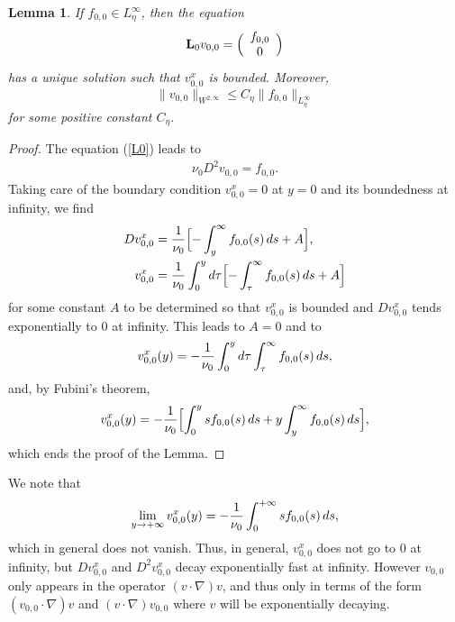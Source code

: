 \documentclass[11pt]{article}
\newtheorem{lemma}[theorem]{Lemma}
\begin{document}
\begin{lemma}\label{lemma 20}
If $f_{0,0} \in L^{\infty}_\eta$, then the equation
\begin{equation} \label{L0}
{\bf L}_0 v_{0,0} = \Bigl( \begin{array}{c} f_{0,0} \cr 0 \cr \end{array} \Bigr)
\end{equation}
has a unique solution such that $v_{0,0}^x$ is bounded.
Moreover, 
$$
\| v_{0,0} \|_{W^{2,\infty}}  \le C_\eta \| f_{0,0} \|_{L^{\infty}_\eta}
$$
for some positive constant $C_\eta$.
\end{lemma}


\begin{proof}
The equation (\ref{L0}) leads to
\begin{align*}
\nu_0 D^2 v_{0,0} = f_{0,0}.
\end{align*}
Taking care of the boundary condition $v_{0,0}^x = 0$ at $y = 0$ and its boundedness at infinity, we find
\begin{align*}
D v_{0,0}^x &= {1 \over \nu_0} \Bigl[ - \int_y^\infty f_{0,0}(s) \, ds + A \Bigr],
\\
v_{0,0}^x &= {1 \over \nu_0} \int_0^y d\tau \Bigl[ - \int_\tau^\infty f_{0,0}(s) \, ds
+ A \Bigr]
\end{align*}
for some constant $A$ to be determined so that $v_{0,0}^x$ is bounded
and $D v_{0,0}^x$ tends exponentially to $0$ at infinity. This leads
to $A = 0$ and to
$$
v_{0,0}^x(y) = - {1 \over \nu_0} \int_0^y d\tau \int_\tau^\infty f_{0,0}(s) \, ds ,
$$
and, by Fubini's theorem,
$$
v_{0,0}^x(y) = - {1 \over \nu_0} \Bigl[ \int_0^y s f_{0,0}(s) \, ds + y \int_y^\infty f_{0,0}(s) \, ds \Bigr],
$$
which ends the proof of the Lemma.
\end{proof}

We note that 
$$
\lim_{y \to + \infty} v_{0,0}^x(y) = - {1 \over \nu_0} \int_0^{+ \infty} s f_{0,0}(s) \, ds,
$$
which in general does not vanish. Thus, in general, $v_{0,0}^x$ does not go to $0$ at infinity, 
but $D v_{0,0}^x$ and $D^2 v_{0,0}^x$ decay exponentially fast at infinity. 
However $v_{0,0}$ only appears in the operator $(v \cdot \nabla) v$,
and thus only in terms of the form $(v_{0,0} \cdot \nabla) v$  and $(v \cdot \nabla) v_{0,0}$ where $v$ will be exponentially decaying.






\end{document}
